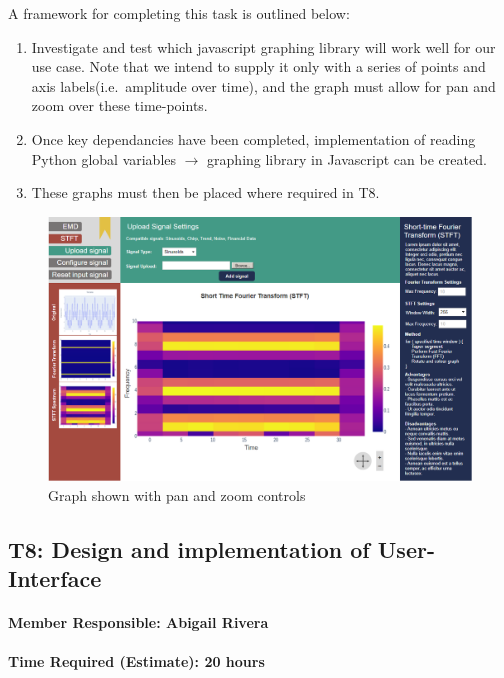 \documentclass[
  paper=a4,
  ,captions=tableheading
]{scrartcl}
\begin{document}
A framework for completing this task is outlined below:
\begin{enumerate}
	\item Investigate and test which javascript graphing library will work well for our use case. Note that we intend to supply it only with a series of points and axis labels(i.e.~amplitude over time), and the graph must allow for pan and zoom over these time-points.
	\item Once key dependancies have been completed, implementation of reading Python global variables $\rightarrow$ graphing library in Javascript can be created.
	\item These graphs must then be placed where required in T8.
\end{enumerate}

\begin{figure}
\centering
\includegraphics{img/STFT_upload.PNG}
\caption{Graph shown with pan and zoom controls}
\end{figure}

\newpage
\hypertarget{t8-design-and-implementation-of-user-interface}{%
\subsection{T8: Design and implementation of
User-Interface}\label{t8-design-and-implementation-of-user-interface}}

\hypertarget{member-responsible-abigail-rivera}{%
\paragraph{Member Responsible: Abigail
Rivera}\label{member-responsible-abigail-rivera}}

\hypertarget{time-required-estimate-20-hours-3}{%
\paragraph{Time Required (Estimate): 20
hours}\label{time-required-estimate-20-hours-3}}
\end{document}
